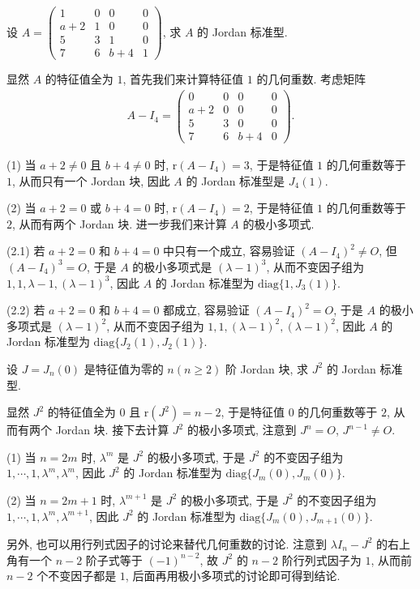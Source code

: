 \documentclass[../../main.tex]{subfiles}
\begin{document}
\begin{example}
设 $A = \begin{pmatrix}
1 & 0 & 0 & 0 \\
a + 2 & 1 & 0 & 0 \\
5 & 3 & 1 & 0 \\
7 & 6 & b + 4 & 1
\end{pmatrix}$, 求 $A$ 的 Jordan 标准型.
\end{example}
\begin{solution}
显然 $A$ 的特征值全为 $1$, 首先我们来计算特征值 $1$ 的几何重数. 考虑矩阵
\begin{align*}
A - I_4 = \begin{pmatrix}
0 & 0 & 0 & 0 \\
a + 2 & 0 & 0 & 0 \\
5 & 3 & 0 & 0 \\
7 & 6 & b + 4 & 0
\end{pmatrix}.
\end{align*}

(1) 当 $a + 2 \neq 0$ 且 $b + 4 \neq 0$ 时, $\mathrm{r}(A - I_4) = 3$, 于是特征值 $1$ 的几何重数等于 $1$, 从而只有一个 Jordan 块, 因此 $A$ 的 Jordan 标准型是 $J_4(1)$.

(2) 当 $a + 2 = 0$ 或 $b + 4 = 0$ 时, $\mathrm{r}(A - I_4) = 2$, 于是特征值 $1$ 的几何重数等于 $2$, 从而有两个 Jordan 块. 进一步我们来计算 $A$ 的极小多项式.

(2.1) 若 $a + 2 = 0$ 和 $b + 4 = 0$ 中只有一个成立, 容易验证 $(A - I_4)^2 \neq O$, 但 $(A - I_4)^3 = O$, 于是 $A$ 的极小多项式是 $(\lambda - 1)^3$, 从而不变因子组为 $1,1,\lambda - 1,(\lambda - 1)^3$, 因此 $A$ 的 Jordan 标准型为 $\mathrm{diag}\{1,J_3(1)\}$.

(2.2) 若 $a + 2 = 0$ 和 $b + 4 = 0$ 都成立, 容易验证 $(A - I_4)^2 = O$, 于是 $A$ 的极小多项式是 $(\lambda - 1)^2$, 从而不变因子组为 $1,1,(\lambda - 1)^2,(\lambda - 1)^2$, 因此 $A$ 的 Jordan 标准型为 $\mathrm{diag}\{J_2(1),J_2(1)\}$. 
\end{solution}

\begin{example}\label{example:J_n(0)的Jordan标准型}
设 $J = J_n(0)$ 是特征值为零的 $n(n \geqslant  2)$ 阶 Jordan 块, 求 $J^2$ 的 Jordan 标准型.
\end{example}
\begin{solution}
显然 $J^2$ 的特征值全为 $0$ 且 $\mathrm{r}(J^2) = n - 2$, 于是特征值 $0$ 的几何重数等于 $2$, 从而有两个 Jordan 块. 接下去计算 $J^2$ 的极小多项式, 注意到 $J^n = O$, $J^{n - 1} \neq O$.

(1) 当 $n = 2m$ 时, $\lambda^m$ 是 $J^2$ 的极小多项式, 于是 $J^2$ 的不变因子组为 $1,\cdots,1,\lambda^m,\lambda^m$, 因此 $J^2$ 的 Jordan 标准型为 $\mathrm{diag}\{J_m(0),J_m(0)\}$.

(2) 当 $n = 2m + 1$ 时, $\lambda^{m + 1}$ 是 $J^2$ 的极小多项式, 于是 $J^2$ 的不变因子组为 $1,\cdots,1,\lambda^m,\lambda^{m + 1}$, 因此 $J^2$ 的 Jordan 标准型为 $\mathrm{diag}\{J_m(0),J_{m + 1}(0)\}$.

另外, 也可以用行列式因子的讨论来替代几何重数的讨论. 注意到 $\lambda I_n - J^2$ 的右上角有一个 $n - 2$ 阶子式等于 $(-1)^{n - 2}$, 故 $J^2$ 的 $n - 2$ 阶行列式因子为 $1$, 从而前 $n - 2$ 个不变因子都是 $1$, 后面再用极小多项式的讨论即可得到结论.
\end{solution}
\end{document}
